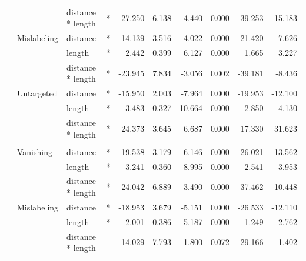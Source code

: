 \begin{longtable}[t]{llllrrrrrr}
\hspace{1em} &  & distance * length & * & -27.250 & 6.138 & -4.440 & 0.000 & -39.253 & -15.183\\
\cmidrule{2-10}\nopagebreak
\hspace{1em} & Mislabeling & distance & * & -14.139 & 3.516 & -4.022 & 0.000 & -21.420 & -7.626\\
\cmidrule{3-10}\nopagebreak
\hspace{1em} &  & length & * & 2.442 & 0.399 & 6.127 & 0.000 & 1.665 & 3.227\\
\cmidrule{3-10}\nopagebreak
\hspace{1em} &  & distance * length & * & -23.945 & 7.834 & -3.056 & 0.002 & -39.181 & -8.436\\
\cmidrule{2-10}\nopagebreak
\hspace{1em} & Untargeted & distance & * & -15.950 & 2.003 & -7.964 & 0.000 & -19.953 & -12.100\\
\cmidrule{3-10}\nopagebreak
\hspace{1em} &  & length & * & 3.483 & 0.327 & 10.664 & 0.000 & 2.850 & 4.130\\
\cmidrule{3-10}\nopagebreak
\hspace{1em} &  & distance * length & * & 24.373 & 3.645 & 6.687 & 0.000 & 17.330 & 31.623\\
\cmidrule{1-10}\pagebreak[0]
\addlinespace[0.3em]
\multicolumn{10}{l}{\textbf{Faster R-CNN}}\\
\hspace{1em} & Vanishing & distance & * & -19.538 & 3.179 & -6.146 & 0.000 & -26.021 & -13.562\\
\cmidrule{3-10}\nopagebreak
\hspace{1em} &  & length & * & 3.241 & 0.360 & 8.995 & 0.000 & 2.541 & 3.953\\
\cmidrule{3-10}\nopagebreak
\hspace{1em} &  & distance * length & * & -24.042 & 6.889 & -3.490 & 0.000 & -37.462 & -10.448\\
\cmidrule{2-10}\nopagebreak
\hspace{1em} & Mislabeling & distance & * & -18.953 & 3.679 & -5.151 & 0.000 & -26.533 & -12.110\\
\cmidrule{3-10}\nopagebreak
\hspace{1em} &  & length & * & 2.001 & 0.386 & 5.187 & 0.000 & 1.249 & 2.762\\
\cmidrule{3-10}\nopagebreak
\hspace{1em} &  & distance * length &  & -14.029 & 7.793 & -1.800 & 0.072 & -29.166 & 1.402\\

\end{longtable}
